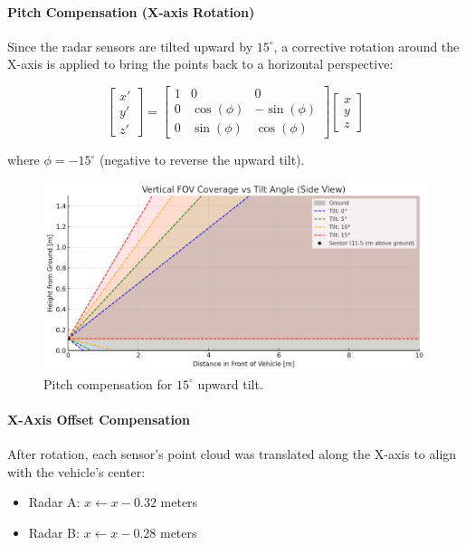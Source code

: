\vspace{2em}

\paragraph{Pitch Compensation (X-axis Rotation)}
Since the radar sensors are tilted upward by $15^\circ$, a corrective rotation around the X-axis is applied to bring the points back to a horizontal perspective: 

\[
\begin{bmatrix}
x' \\ y' \\ z'
\end{bmatrix}
=
\begin{bmatrix}
1 & 0 & 0 \\
0 & \cos(\phi) & -\sin(\phi) \\
0 & \sin(\phi) & \cos(\phi)
\end{bmatrix}
\begin{bmatrix}
x \\ y \\ z
\end{bmatrix}
\]

where $\phi = -15^\circ$ (negative to reverse the upward tilt).

\begin{figure}[!htbp]
    \centering
    \includegraphics[width=0.8\linewidth]{images/TiltSensor.png}
    \caption{Pitch compensation for $15^\circ$ upward tilt.}
    \label{fig:x_axis_rotation}
\end{figure}

\vspace{2em}

\paragraph{X-Axis Offset Compensation}
After rotation, each sensor's point cloud was translated along the X-axis to align with the vehicle's center:
\begin{itemize}
    \item Radar A: $x \leftarrow x - 0.32$ meters
    \item Radar B: $x \leftarrow x - 0.28$ meters
\end{itemize}

